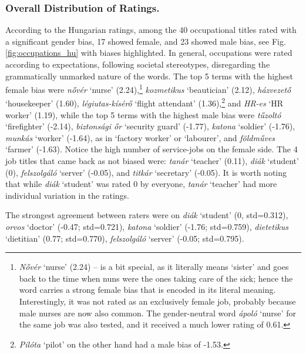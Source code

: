 \documentclass[runningheads]{llncs}
\begin{document}
\subsubsection{Overall Distribution of Ratings.}

According to the Hungarian ratings, among the 40 occupational titles rated with a significant gender bias, 17 showed female, and 23 showed male bias, see Fig. \ref{fig:occupations_hu} with biases highlighted.
In general, occupations were rated according to expectations, following societal stereotypes, disregarding the grammatically unmarked nature of the words. The top 5 terms with the highest female bias were \textit{nővér} `nurse' (2.24),\footnote{\textit{Nővér} `nurse' (2.24) -- is a bit special, as it literally means `sister' and goes back to the time when nuns were the ones taking care of the sick; hence the word carries a strong female bias that is encoded in its literal meaning. Interestingly, it was not rated as an exclusively female job, probably because male nurses are now also common. The gender-neutral word \textit{ápoló} `nurse' for the same job was also tested, and it received a much lower rating of 0.61.} \textit{kozmetikus} `beautician' (2.12), \textit{házvezető} `housekeeper' (1.60), \textit{légiutas-kísérő} `flight attendant' (1.36),\footnote{\textit{Pilóta} `pilot' on the other hand had a male bias of -1.53.} and \textit{HR-es} `HR worker' (1.19), while the top 5 terms with the highest male bias were \textit{tűzoltó} `firefighter' (-2.14), \textit{biztonsági őr} `security guard' (-1.77), \textit{katona} `soldier' (-1.76), \textit{munkás} `worker' (-1.64), as in `factory worker' or `labourer', and \textit{földműves} `farmer' (-1.63). Notice the high number of service-jobs on the female side. The 4 job titles that came back as not biased were: \textit{tanár} `teacher' (0.11), \textit{diák} `student' (0), \textit{felszolgáló} `server' (-0.05), and \textit{titkár} `secretary' (-0.05). It is worth noting that while \textit{diák} `student' was rated 0 by everyone, \textit{tanár} `teacher' had more individual variation in the ratings.

The strongest agreement between raters were on \textit{diák} `student' (0, std=0.312), \textit{orvos} `doctor' (-0.47; std=0.721), \textit{katona} `soldier' (-1.76; std=0.759), \textit{dietetikus} `dietitian' (0.77; std=0.770), \textit{felszolgáló} `server' (-0.05; std=0.795).
\end{document}

